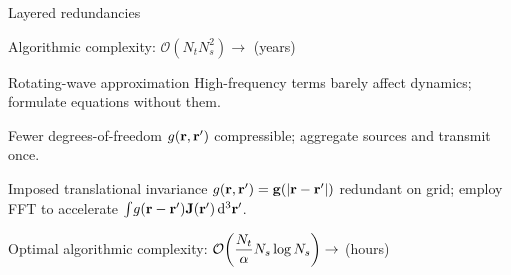 \documentclass[aspectratio=169, usenames, dvipsnames]{beamer}
\begin{document}
\begin{frame}{Layered redundancies}
  \begin{center}
    Algorithmic complexity: $\displaystyle\mathcal{O}(N_t N_s^2) \to$ \alert{(years)}
  \end{center}
  \begin{block}{Rotating-wave approximation}
    High-frequency terms barely affect dynamics; formulate equations without them.
  \end{block}
  \begin{block}{Fewer degrees-of-freedom}
    $g(\vb{r}, \vb{r}')$ compressible; aggregate sources and transmit once.
  \end{block}
  \begin{block}{Imposed translational invariance}
    $g(\vb{r}, \vb{r}') = \vb{g}(\abs{\vb{r} - \vb{r}'})$ redundant on grid; employ FFT to accelerate $\int_{}g(\vb{r} - \vb{r}') \vb{J}(\vb{r'}) \dd[3]{\vb{r}'}$.
  \end{block}
  \begin{center}
    Optimal algorithmic complexity: $\displaystyle\mathcal{O}\qty(\frac{N_t}{\alpha} N_s \log N_s) \to$ \alert{(hours)}
  \end{center}
\end{frame}
\end{document}
